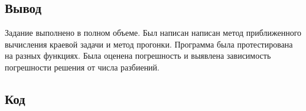 \documentclass[a4paper,12pt]{article}
\begin{document}
	\subsection{Вывод}
	Задание выполнено в полном объеме.
	Был написан написан метод приближенного вычисления краевой задачи и метод прогонки.
	Программа была протестирована на разных функциях.
	Была оценена погрешность и выявлена зависимость погрешности решения от числа разбиений.
	\newpage
	\subsection{Код}
	\inputminted{c++}{../lab1/src/main.cpp}
	\inputminted{c++}{../lab1/src/data_table.hpp}
	\inputminted{c++}{../lab1/include/tma.hpp}
	\inputminted{c++}{../lab1/include/balance.hpp}
	\inputminted{c++}{../lab1/include/utils.hpp}
	\inputminted{c++}{../lab1/include/utils/balance_utils.hpp}
	\inputminted{c++}{../lab1/include/utils/data.hpp}
	\inputminted{c++}{../lab1/include/utils/grid.hpp}
	\inputminted{c++}{../lab1/test/test_tma.cpp}
	\inputminted{c++}{../lab1/test/test_utils.hpp}
\end{document}
